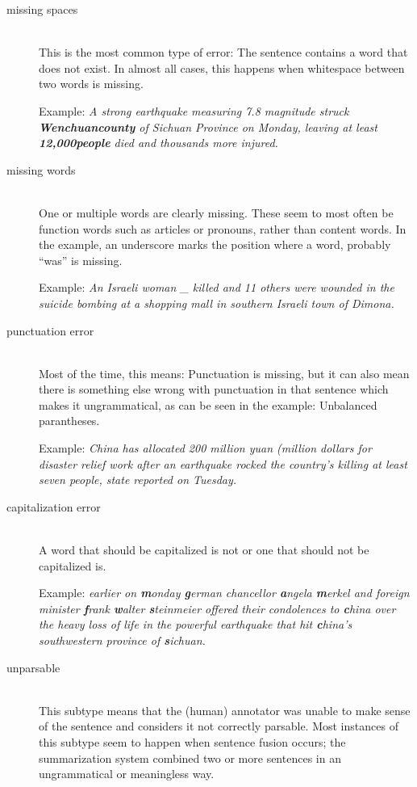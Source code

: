 \documentclass[a4paper,10pt]{scrartcl}
\theoremstyle{style}
\begin{document}
\begin{description}
\item[missing spaces] \hfill \\
	This is the most common type of error: The sentence contains a word that does not exist. In almost all cases, this happens when whitespace between two words is missing.

	Example: \textit{A strong earthquake measuring 7.8 magnitude struck \\\textbf{Wenchuancounty} of Sichuan Province on Monday, leaving at least \\\textbf{12,000people} died and thousands more injured.}

\item[missing words] \hfill \\
	One or multiple words are clearly missing. These seem to most often be function words such as articles or pronouns, rather than content words. In the example, an underscore marks the position where a word, probably ``was'' is missing.

	Example: \textit{An Israeli woman \_ killed and 11 others were wounded in the suicide bombing at a shopping mall in southern Israeli town of Dimona.}

\item[punctuation error] \hfill \\
	Most of the time, this means: Punctuation is missing, but it can also mean there is something else wrong with punctuation in that sentence which makes it ungrammatical, as can be seen in the example: Unbalanced parantheses.

	Example: \textit{China has allocated 200 million yuan (million dollars for disaster relief work after an earthquake rocked the country's killing at least seven people, state reported on Tuesday.}

\item[capitalization error] \hfill \\
	A word that should be capitalized is not or one that should not be capitalized is.

	Example: \textit{earlier on \textbf{m}onday \textbf{g}erman chancellor \textbf{a}ngela \textbf{m}erkel and foreign \\minister \textbf{f}rank \textbf{w}alter \textbf{s}teinmeier offered their condolences to \textbf{c}hina over the heavy loss of life in the powerful earthquake that hit \textbf{c}hina's southwestern province of \textbf{s}ichuan.}

\item[unparsable]\hfill \\
	This subtype means that the (human) annotator was unable to make sense of the sentence and considers it not correctly parsable. Most instances of this subtype seem to happen when sentence fusion occurs; the summarization system combined two or more sentences in an ungrammatical or meaningless way.


\end{description}
\end{document}
